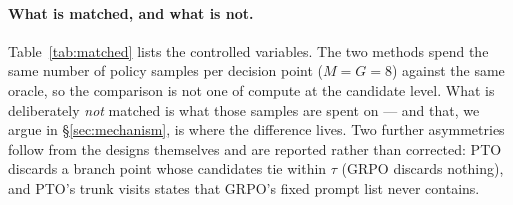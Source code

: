 \paragraph{What is matched, and what is not.}
Table~\ref{tab:matched} lists the controlled variables. The two methods spend the same
number of policy samples per decision point ($M = G = 8$) against the same oracle, so the
comparison is not one of compute at the candidate level. What is deliberately \emph{not}
matched is what those samples are spent on --- and that, we argue in
\S\ref{sec:mechanism}, is where the difference lives. Two further asymmetries follow from
the designs themselves and are reported rather than corrected: PTO discards a branch point
whose candidates tie within $\tau$ (GRPO discards nothing), and PTO's trunk visits states
that GRPO's fixed prompt list never contains.
